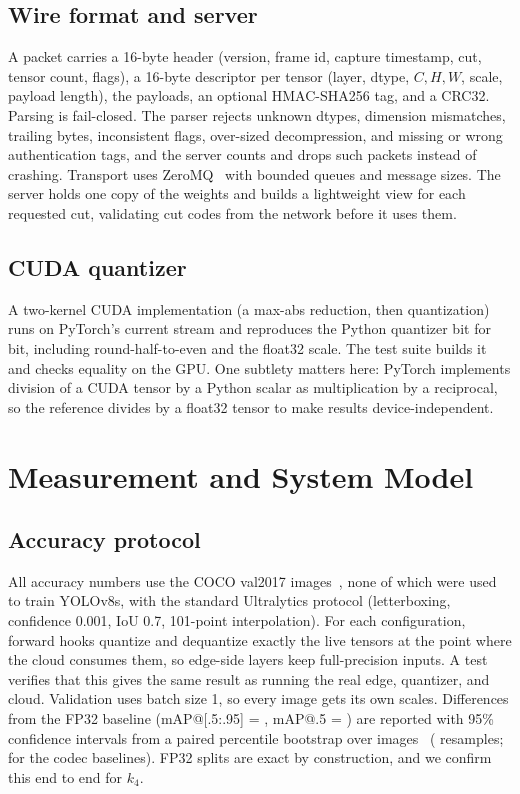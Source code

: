 \documentclass[journal,twocolumn,10pt]{IEEEtran}
\begin{document}
\subsection{Wire format and server}
A packet carries a 16-byte header (version, frame id, capture timestamp, cut, tensor count, flags), a 16-byte descriptor per tensor (layer, dtype, $C,H,W$, scale, payload length), the payloads, an optional HMAC-SHA256 tag, and a CRC32. Parsing is fail-closed. The parser rejects unknown dtypes, dimension mismatches, trailing bytes, inconsistent flags, over-sized decompression, and missing or wrong authentication tags, and the server counts and drops such packets instead of crashing. Transport uses ZeroMQ~\cite{hintjens2013zeromq} with bounded queues and message sizes. The server holds one copy of the weights and builds a lightweight view for each requested cut, validating cut codes from the network before it uses them.

\subsection{CUDA quantizer}
A two-kernel CUDA implementation (a max-abs reduction, then quantization) runs on PyTorch's current stream and reproduces the Python quantizer bit for bit, including round-half-to-even and the float32 scale. The test suite builds it and checks equality on the GPU. One subtlety matters here: PyTorch implements division of a CUDA tensor by a Python scalar as multiplication by a reciprocal, so the reference divides by a float32 tensor to make results device-independent.

\section{Measurement and System Model}\label{sec:model}
\subsection{Accuracy protocol}
All accuracy numbers use the \NumValImages{} COCO val2017 images~\cite{lin2014microsoft}, none of which were used to train YOLOv8s, with the standard Ultralytics protocol (letterboxing, confidence 0.001, IoU 0.7, 101-point interpolation). For each configuration, forward hooks quantize and dequantize exactly the live tensors at the point where the cloud consumes them, so edge-side layers keep full-precision inputs. A test verifies that this gives the same result as running the real edge, quantizer, and cloud. Validation uses batch size 1, so every image gets its own scales. Differences from the FP32 baseline (mAP@[.5:.95] = \BaselineMAP, mAP@.5 = \BaselineMAPfifty) are reported with 95\% confidence intervals from a paired percentile bootstrap over images~\cite{efron1993bootstrap} (\NBootAccuracy{} resamples; \NBootCodec{} for the codec baselines). FP32 splits are exact by construction, and we confirm this end to end for $k_4$.
\end{document}
